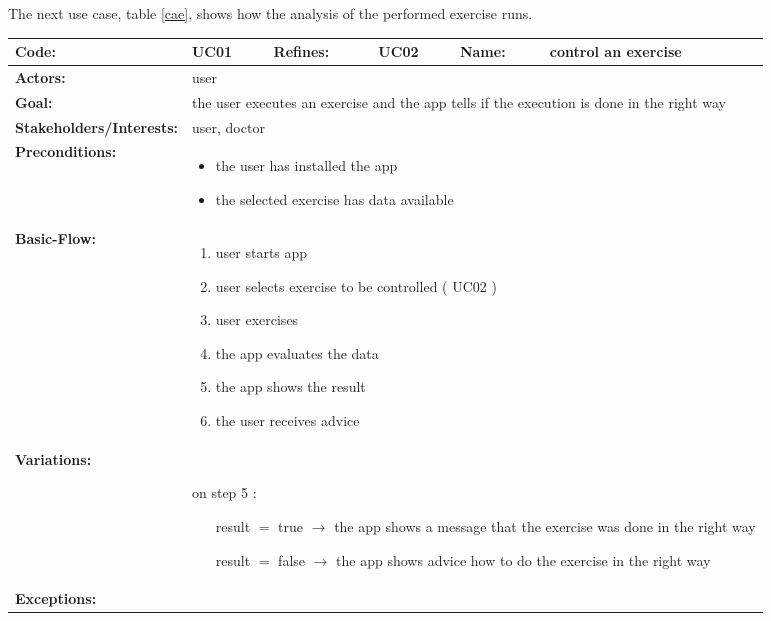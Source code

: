 


\clearpage

The next use case, table \ref{cae}, shows how the analysis of the performed exercise runs.
\begin{table}[H]
	\begin{tabular}{|l|l|l|l|l|l|} \hline
		\textbf{Code:} & UC01 & \textbf{Refines:} & UC02 & \textbf{Name:} & control an exercise \\ \hline
		\textbf{Actors:} & \multicolumn{5}{l|}{user} \\ \hline
		\textbf{Goal:} & \multicolumn{5}{l|}{the user executes an exercise and the app tells if the execution is done in the right way} \\ \hline
		\textbf{Stakeholders/Interests:} & \multicolumn{5}{l|}{user, doctor} \\ \hline
		\textbf{Preconditions:} & \multicolumn{5}{l|}{\parbox{0.75\textwidth}{
			\begin{itemize}
				\item the user has installed the app
				\item the selected exercise has data available
			\end{itemize}
		}} \\ \hline
		\textbf{Basic-Flow:} & \multicolumn{5}{l|}{\parbox{0.75\textwidth}{
			\begin{enumerate}
				\item user starts app
				\item user selects exercise to be controlled ( UC02 )
				\item user exercises
				\item the app evaluates the data
				\item the app shows the result
				\item the user receives advice
			\end{enumerate}
		}} \\ \hline
		\textbf{Variations:} & \multicolumn{5}{l|}{\parbox{0.75\textwidth}{
			$ $\\on step 5 :
			\begin{itemize}[leftmargin=2.5cm]
				\item[result $=$ true ] $\rightarrow$ the app shows a message that the exercise was done in the right way 
				\item[result $=$ false] $\rightarrow$ the app shows advice how to do the exercise in the right way
			\end{itemize}
		}} \\ \hline
		\textbf{Exceptions:} & \multicolumn{5}{l|}{\parbox{0.75\textwidth}{
}}
\end{tabular}
\end{table}
